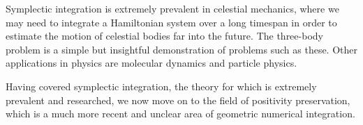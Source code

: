 Symplectic integration is extremely prevalent in celestial mechanics, where we may need to integrate a Hamiltonian system over a long timespan in order to estimate the motion of celestial bodies far into the future.
The three-body problem is a simple but insightful demonstration of problems such as these.
Other applications in physics are molecular dynamics and particle physics.

Having covered symplectic integration, the theory for which is extremely prevalent and researched,
we now move on to the field of positivity preservation, which is a much more recent and unclear area of geometric numerical integration.



